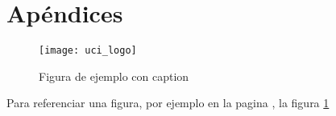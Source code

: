 \chapter*{Apéndices}

\begin{figure}[h]
\centering
\texttt{[image: uci\_logo]}
\caption{Figura de ejemplo con caption}
\label{fig:uci_logo}
\end{figure}
Para referenciar una figura, por ejemplo en la pagina \pageref{fig:uci_logo} , la figura \ref{fig:uci_logo}
